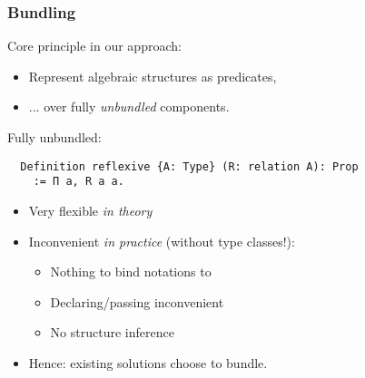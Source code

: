\documentclass{beamer}
\begin{document}

\begin{frame}
\frametitle{Bundling}

Core principle in our approach: \\
\begin{itemize}
\item[] Represent algebraic structures as predicates,
\item[] ... over fully \emph{unbundled} components.
\end{itemize}
\end{frame}

\begin{frame}[fragile]

Fully {\color{blue}unbundled}:
\begin{lstlisting}
  Definition reflexive {A: Type} (R: relation A): Prop
    := Π a, R a a.
\end{lstlisting}

\begin{itemize}
\item Very flexible \emph{in theory}
\item Inconvenient \emph{in practice} (without type classes!):
  \begin{itemize}
    \item Nothing to bind notations to %
    \item Declaring/passing inconvenient %
    \item No structure inference %
  \end{itemize}
\pause
\item Hence: existing solutions choose to bundle. %
\end{itemize}
\end{frame}
\end{document}
